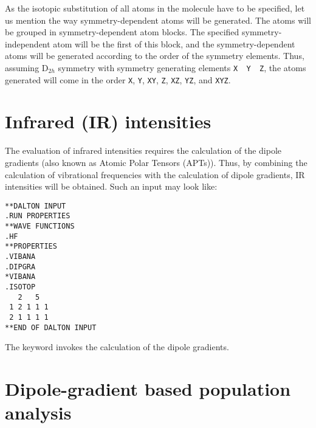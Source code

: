 As the isotopic substitution of all atoms in the molecule have to be
specified, let us mention the way symmetry-dependent atoms will be
generated. The atoms will be grouped in symmetry-dependent atom
blocks. The specified symmetry-independent atom will be the first of
this block, and the symmetry-dependent atoms will be generated
according to the order of the symmetry elements. Thus, assuming
D$_{2h}$ symmetry with symmetry generating elements \verb|X  Y  Z|,
the atoms generated will come in the order \verb|X|, \verb|Y|,
\verb|XY|, \verb|Z|, \verb|XZ|, \verb|YZ|, and \verb|XYZ|.

\section{Infrared (IR) intensities}\label{sec:irint}

\begin{center}
\end{center}

 The evaluation of infrared intensities
requires the calculation of the
dipole gradients (also known as Atomic Polar Tensors (APTs)). Thus, by
combining the calculation of vibrational frequencies with the
calculation of dipole gradients, IR intensities will be obtained. Such
an input may look like:

\begin{verbatim}
**DALTON INPUT
.RUN PROPERTIES
**WAVE FUNCTIONS
.HF
**PROPERTIES
.VIBANA
.DIPGRA
*VIBANA
.ISOTOP
   2   5
 1 2 1 1 1
 2 1 1 1 1
**END OF DALTON INPUT
\end{verbatim}

\noindent The keyword  invokes the calculation of the dipole
gradients.

\section{Dipole-gradient based population analysis}

